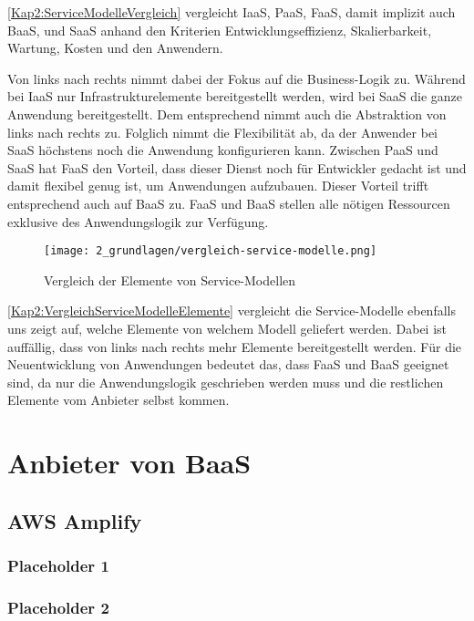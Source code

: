 \autoref{Kap2:ServiceModelleVergleich} vergleicht \ac{IaaS}, \ac{PaaS}, \ac{FaaS}, damit implizit auch \ac{BaaS}, und \ac{SaaS} anhand den Kriterien Entwicklungseffizienz, Skalierbarkeit, Wartung, Kosten und den Anwendern.

Von links nach rechts nimmt dabei der Fokus auf die Business-Logik zu. Während bei \ac{IaaS} nur Infrastrukturelemente bereitgestellt werden, wird bei \ac{SaaS} die ganze Anwendung bereitgestellt. Dem entsprechend nimmt auch die Abstraktion von links nach rechts zu. Folglich nimmt die Flexibilität ab, da der Anwender bei \ac{SaaS} höchstens noch die Anwendung konfigurieren kann. Zwischen \ac{PaaS} und \ac{SaaS} hat \ac{FaaS} den Vorteil, dass dieser Dienst noch für Entwickler gedacht ist und damit flexibel genug ist, um Anwendungen aufzubauen. Dieser Vorteil trifft entsprechend auch auf \ac{BaaS} zu. \ac{FaaS} und \ac{BaaS} stellen alle nötigen Ressourcen exklusive des Anwendungslogik zur Verfügung.

\begin{figure}[h]
  \centering
  \texttt{[image: 2\_grundlagen/vergleich-service-modelle.png]}
  \caption{Vergleich der Elemente von Service-Modellen \autocite{jiang2020overview}}
  \label{Kap2:VergleichServiceModelleElemente}
\end{figure}

\autoref{Kap2:VergleichServiceModelleElemente} vergleicht die Service-Modelle ebenfalls uns zeigt auf, welche Elemente von welchem Modell geliefert werden. Dabei ist auffällig, dass von links nach rechts mehr Elemente bereitgestellt werden. Für die Neuentwicklung von Anwendungen bedeutet das, dass \ac{FaaS} und \ac{BaaS} geeignet sind, da nur die Anwendungslogik geschrieben werden muss und die restlichen Elemente vom Anbieter selbst kommen.

\section{Anbieter von \acl{BaaS}}

\subsection{AWS Amplify}

\subsubsection{Placeholder 1}
\subsubsection{Placeholder 2}

